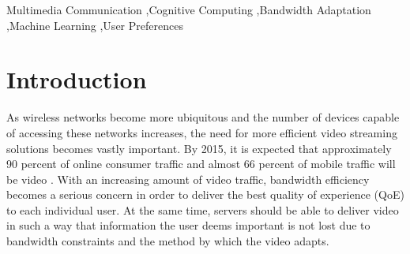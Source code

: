 \documentclass[3p,times,procedia]{elsarticle}
\begin{document}
\begin{frontmatter}
\begin{keyword}
Multimedia Communication \sep Cognitive Computing \sep Bandwidth Adaptation \sep Machine Learning \sep User Preferences 


\end{keyword}

\end{frontmatter}



\section{Introduction}
\label{sec:Intro}

As wireless networks become more ubiquitous and the number of devices capable of accessing these networks increases, the need for more efficient video streaming solutions becomes vastly important. By 2015, it is expected that approximately 90 percent of online consumer traffic and almost 66 percent of mobile traffic will be video \cite{HASQoE}. With an increasing amount of video traffic, bandwidth efficiency becomes a serious concern in order to deliver the best quality of experience (QoE) to each individual user. At the same time, servers should be able to deliver video in such a way that information the user deems important is not lost due to bandwidth constraints and the method by which the video adapts.
\end{document}
